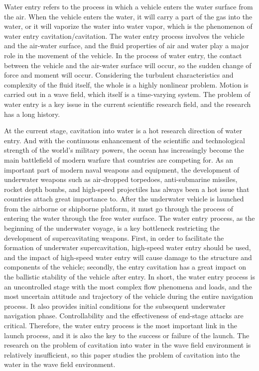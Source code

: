 
\begin{digest}
  Water entry refers to the process in which a vehicle enters the water surface from the air. When the vehicle enters the water, it will carry a part of the gas into the water, or it will vaporize the water into water vapor, which is the phenomenon of water entry cavitation/cavitation. The water entry process involves the vehicle and the air-water surface, and the fluid properties of air and water play a major role in the movement of the vehicle. In the process of water entry, the contact between the vehicle and the air-water surface will occur, so the sudden change of force and moment will occur. Considering the turbulent characteristics and complexity of the fluid itself, the whole is a highly nonlinear problem. Motion is carried out in a wave field, which itself is a time-varying system. The problem of water entry is a key issue in the current scientific research field, and the research has a long history.

  At the current stage, cavitation into water is a hot research direction of water entry. And with the continuous enhancement of the scientific and technological strength of the world's military powers, the ocean has increasingly become the main battlefield of modern warfare that countries are competing for. As an important part of modern naval weapons and equipment, the development of underwater weapons such as air-dropped torpedoes, anti-submarine missiles, rocket depth bombs, and high-speed projectiles has always been a hot issue that countries attach great importance to. After the underwater vehicle is launched from the airborne or shipborne platform, it must go through the process of entering the water through the free water surface. The water entry process, as the beginning of the underwater voyage, is a key bottleneck restricting the development of supercavitating weapons. First, in order to facilitate the formation of underwater supercavitation, high-speed water entry should be used, and the impact of high-speed water entry will cause damage to the structure and components of the vehicle; secondly, the entry cavitation has a great impact on the ballistic stability of the vehicle after entry. In short, the water entry process is an uncontrolled stage with the most complex flow phenomena and loads, and the most uncertain attitude and trajectory of the vehicle during the entire navigation process. It also provides initial conditions for the subsequent underwater navigation phase. Controllability and the effectiveness of end-stage attacks are critical. Therefore, the water entry process is the most important link in the launch process, and it is also the key to the success or failure of the launch. The research on the problem of cavitation into water in the wave field environment is relatively insufficient, so this paper studies the problem of cavitation into the water in the wave field environment.
  

\end{digest}

